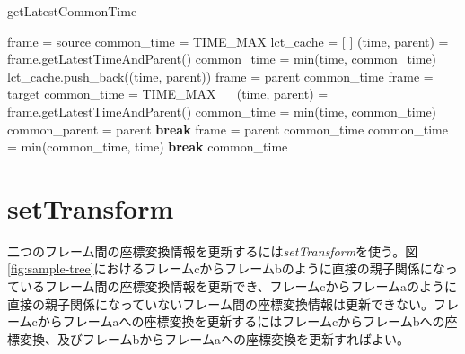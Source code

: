 \documentclass[a4paper]{jreport}	%
\begin{document}
\begin{algorithm}
\caption{getLatestCommonTime}
\begin{algorithmic}[1]
	 
	\State frame = source
	\State common\_time = TIME\_MAX
	\State lct\_cache = [ ] 
	  \label{code:getLatest-s-r}
	\State (time, parent) = frame.getLatestTimeAndParent()
	\State common\_time = min(time, common\_time)
	\State lct\_cache.push\_back((time, parent)) \label{code:getLatest-add-history}
	\State frame = parent
	  \label{code:getLatest-t-is-p-of-s}
	\State \Return common\_time
	\EndIf
	\EndWhile \label{code:getLatest-s-r2}
	\State frame = target
	\State common\_time = TIME\_MAX
	　 \label{code:getLatest-t-r}
	\State (time, parent) = frame.getLatestTimeAndParent()
	\State common\_time = min(time, common\_time)
	  \label{code:getLatest-s-and-t-have-parent}
	\State common\_parent = parent
	\State \textbf{break}
	\EndIf
	\State frame = parent
	  \label{code:getLatest-s-is-p-of-t}
	\State \Return common\_time
	\EndIf
	\EndWhile \label{code:getLatest-t-r2}
	  \label{code:getLatest-min}
	\State common\_time = min(common\_time, time)
	\State \textbf{break}
	\EndIf
	\EndFor \label{code:getLatest-min2}
	\State \Return common\_time
	\EndFunction
\end{algorithmic}
\end{algorithm}


\section{setTransform}
\label{section:chap3-setTransform}
二つのフレーム間の座標変換情報を更新するには\textit{setTransform}を使う。図\ref{fig:sample-tree}におけるフレームcからフレームbのように直接の親子関係になっているフレーム間の座標変換情報を更新でき、フレームcからフレームaのように直接の親子関係になっていないフレーム間の座標変換情報は更新できない。フレームcからフレームaへの座標変換を更新するにはフレームcからフレームbへの座標変換、及びフレームbからフレームaへの座標変換を更新すればよい。
\end{document}
